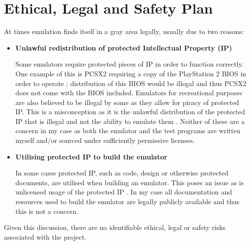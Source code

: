 \section{Ethical, Legal and Safety Plan}
\label{section:legal}

At times emulation finds itself in a gray area legally, usually due to two reasons:

\begin{itemize}
    \item \textbf{Unlawful redistribution of protected Intellectual Property (IP)} %
    
    Some emulators require protected pieces of IP in order to function correctly. One example of this is PCSX2 requiring a copy of the PlayStation 2 BIOS in order to operate \cite{PCSX2-getting-started}; distribution of this BIOS would be illegal and thus PCSX2 does not come with the BIOS included. Emulators for recreational purposes are also believed to be illegal by some as they allow for piracy of protected IP. This is a misconception as it is the unlawful distribution of the protected IP that is illegal and not the ability to emulate them \cite{nintendo-court-case, sega-court-case, sony-court-case}. Neither of these are a concern in my case as both the emulator and the test programs are written myself and/or sourced under sufficiently permissive licenses.

    \item \textbf{Utilising protected IP to build the emulator} %
    
    In some cases protected IP, such as code, design or otherwise protected documents, are utilised when building an emulator. This poses an issue as is unlicensed usage of the protected IP \cite{nintendo-source-leak}. In my case all documentation and resources used to build the emulator are legally publicly available and thus this is not a concern.
\end{itemize}

Given this discussion, there are no identifiable ethical, legal or safety risks associated with the project.